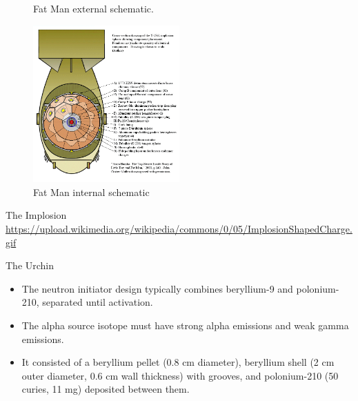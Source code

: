 \documentclass{loyola-beamer}
\begin{document}
\begin{frame}
	\begin{figure}
		\begin{center}
			
		\end{center}
		\caption{Fat Man external schematic. }
	\end{figure}
\end{frame}

\begin{frame}
	\begin{figure}
		\begin{center}
			\includegraphics[width=0.5\textwidth]{figures/Fat_Man_Internal_Components.png}
		\end{center}
		\caption{Fat Man internal schematic}
	\end{figure}
\end{frame}

\begin{frame}{The Implosion}
	\url{https://upload.wikimedia.org/wikipedia/commons/0/05/ImplosionShapedCharge.gif}
\end{frame}

\begin{frame}{The Urchin}
	\begin{itemize}
		\item The neutron initiator design typically combines beryllium-9 and polonium-210, separated until activation.
		\item The alpha source isotope must have strong alpha emissions and weak gamma emissions.
		\item It consisted of a beryllium pellet (0.8 cm diameter), beryllium shell (2 cm outer diameter, 0.6 cm wall thickness) with grooves, and polonium-210 (50 curies, 11 mg) deposited between them.
	\end{itemize}
\end{frame}
\end{document}
